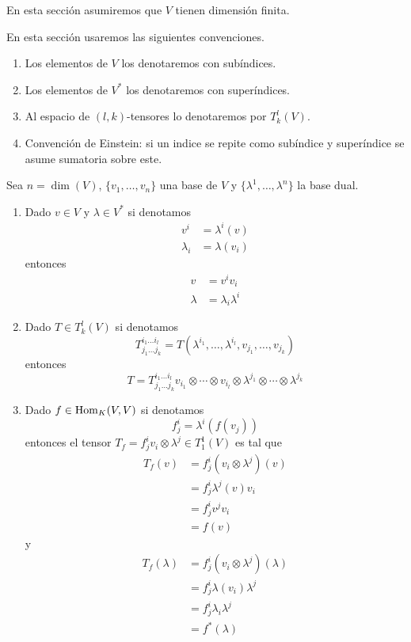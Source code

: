 En esta secci\'on asumiremos que $V$ tienen dimensi\'on finita.

\begin{nota}
En esta secci\'on usaremos las siguientes convenciones.
\begin{enumerate}
\item Los elementos de $V$ los denotaremos con sub\'indices.
\item Los elementos de $V^*$ los denotaremos con super\'indices.
\item Al espacio de $(l,k)$-tensores lo denotaremos por $T^l_k(V)$.
\item Convenci\'on de Einstein: si un indice se repite como sub\'indice y super\'indice se asume sumatoria sobre este.
\end{enumerate}
\end{nota}

\begin{ejem}
Sea $n=\dim(V)$, $\{v_1,\ldots,v_n\}$ una base de $V$ y $\{\lambda^1,\ldots,\lambda^n\}$ la base dual.
\begin{enumerate}
\item Dado $v\in V$ y $\lambda\in V^*$ si denotamos
\begin{align*}
v^i &= \lambda^i(v)\\
\lambda_i &=\lambda(v_i)
\end{align*}
entonces
\begin{align*}
v &= v^iv_i\\
\lambda &=\lambda_i\lambda^i
\end{align*}
\item Dado $T\in T^l_k(V)$ si denotamos
$$T^{i_1\ldots i_l}_{j_1\ldots j_k}=T(\lambda^{i_1},\ldots,\lambda^{i_l},v_{j_1},\ldots,v_{j_k})$$
entonces
$$T=T^{i_1\ldots i_l}_{j_1\ldots j_k}v_{i_1}\otimes\cdots\otimes v_{i_l}\otimes\lambda^{j_1}\otimes\cdots\otimes\lambda^{j_k}$$
\item Dado $f\in\operatorname{Hom}_K(V,V)$ si denotamos
$$f^i_j=\lambda^i(f(v_j))$$
entonces el tensor $T_f=f^i_jv_i\otimes\lambda^j\in T^1_1(V)$ es tal que
\begin{align*}
T_f(v) &= f^i_j\left(v_i\otimes\lambda^j\right)(v)\\
 &= f^i_j\lambda^j(v)v_i\\
 &= f^i_jv^jv_i\\
 &= f(v)
\end{align*}
y
\begin{align*}
T_f(\lambda) &= f^i_j\left(v_i\otimes\lambda^j\right)(\lambda)\\
 &= f^i_j\lambda(v_i)\lambda^j\\
 &= f^i_j\lambda_i\lambda^j\\
 &= f^*(\lambda)
\end{align*}
\end{enumerate}
\end{ejem}


